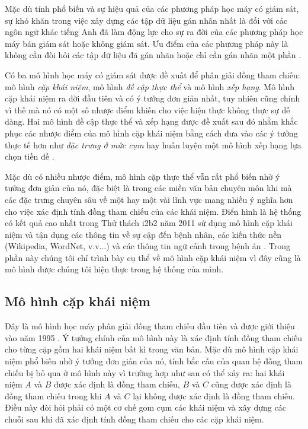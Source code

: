 Mặc dù tính phổ biến và sự hiệu quả của các phương pháp học máy có giám sát, sự khó khăn trong việc xây dựng các tập dữ liệu gán nhãn nhất là đối với các ngôn ngữ khác tiếng Anh đã làm động lực cho sự ra đời của các phương pháp học máy bán giám sát hoặc không giám sát. Ưu điểm của các phương pháp này là không cần đòi hỏi các tập dữ liệu đã gán nhãn hoặc chỉ cần gán nhãn một phần \cite{CardieWagstaff1999}.

Có ba mô hình học máy có giám sát được đề xuất để phân giải đồng tham chiếu: mô hình \emph{cặp khái niệm}, mô hình \emph{đề cập thực thể} và mô hình \emph{xếp hạng}. Mô hình cặp khái niệm ra đời đầu tiên và có ý tưởng đơn giản nhất, tuy nhiên cũng chính vì thế mà nó có một số nhược điểm khiến cho việc hiện thực không thực sự dễ dàng. Hai mô hình đề cập thực thể và xếp hạng được đề xuất sau đó nhằm khắc phục các nhược điểm của mô hình cặp khái niệm bằng cách đưa vào các ý tưởng thực tế hơn như \emph{đặc trưng ở mức cụm} \cite{Yang2004} hay huấn luyện một mô hình xếp hạng lựa chọn tiền đề \cite{Yang2003}.

Mặc dù có nhiều nhược điểm, mô hình cặp thực thể vẫn rất phổ biến nhờ ý tưởng đơn giản của nó, đặc biệt là trong các miền văn bản chuyên môn khi mà các đặc trưng chuyên sâu về một hay một vài lĩnh vực mang nhiều ý nghĩa hơn cho việc xác định tính đồng tham chiếu của các khái niệm. Điển hình là hệ thống có kết quả cao nhất trong Thử thách i2b2 năm 2011 sử dụng mô hình cặp khái niệm và tận dụng các thông tin về sự cập đến bệnh nhân, các kiến thức nền (Wikipedia, WordNet, v.v...) và các thông tin ngữ cảnh trong bệnh án \cite{YanXu2012}. Trong phần này chúng tôi chỉ trình bày cụ thể về mô hình cặp khái niệm vì đây cũng là mô hình được chúng tôi hiện thực trong hệ thống của mình.

\subsection*{Mô hình cặp khái niệm}
Đây là mô hình học máy phân giải đồng tham chiếu đầu tiên và được giới thiệu vào năm 1995 \cite{Aone&Bennett1995}. Ý tưởng chính của mô hình này là xác định tính đồng tham chiếu cho từng cặp gồm hai khái niệm bất kì trong văn bản. Mặc dù mô hình cặp khái niệm phổ biến nhờ ý tưởng đơn giản của nó, tính bắc cầu của quan hệ đồng tham chiếu bị bỏ qua ở mô hình này vì trường hợp như sau có thể xảy ra: hai khái niệm $A$ và $B$ được xác định là đồng tham chiếu, $B$ và $C$ cũng được xác định là đồng tham chiếu trong khi $A$ và $C$ lại không được xác định là đồng tham chiếu. Điều này đòi hỏi phải có một cơ chế gom cụm các khái niệm và xây dựng các chuỗi sau khi đã xác định tính đồng tham chiếu cho các cặp khái niệm.

